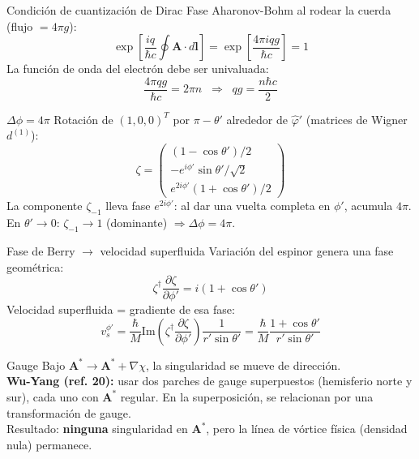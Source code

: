 \documentclass[aspectratio=169]{beamer}
\begin{document}
	\begin{frame}{Condición de cuantización de Dirac}
		Fase Aharonov-Bohm al rodear la cuerda (flujo $= 4\pi g$):
		\[ \exp\!\left[\frac{iq}{\hbar c}\oint\mathbf{A}\cdot d\mathbf{l}\right]
		= \exp\!\left[\frac{4\pi i qg}{\hbar c}\right] = 1 \]
		La función de onda del electrón debe ser univaluada:
		\[ \frac{4\pi qg}{\hbar c} = 2\pi n
		\;\;\Rightarrow\;\; \boxed{qg = \frac{n\hbar c}{2}} \]
	\end{frame}
	
	\begin{frame}{$\Delta\phi = 4\pi$}
		Rotación de $(1,0,0)^T$ por $\pi-\theta'$ alrededor de $\hat{\varphi}'$
		(matrices de Wigner $d^{(1)}$):
		\[ \zeta = \begin{pmatrix}(1-\cos\theta')/2 \\
			-e^{i\phi'}\sin\theta'/\sqrt{2} \\
			e^{2i\phi'}(1+\cos\theta')/2 \end{pmatrix} \]
		La componente $\zeta_{-1}$ lleva fase $e^{2i\phi'}$:
		al dar una vuelta completa en $\phi'$, acumula $4\pi$.\\[6pt]
		En $\theta'\to 0$: $\zeta_{-1}\to 1$ (dominante) $\Rightarrow \Delta\phi = 4\pi$.
	\end{frame}
	
	\begin{frame}{Fase de Berry $\to$ velocidad superfluida}
		Variación del espinor genera una fase geométrica:
		\[ \zeta^\dagger\frac{\partial\zeta}{\partial\phi'}
		= i(1+\cos\theta') \]
		Velocidad superfluida = gradiente de esa fase:
		\[ v_s^{\phi'} = \frac{\hbar}{M}
		\mathrm{Im}\!\left(\zeta^\dagger\frac{\partial\zeta}{\partial\phi'}\right)
		\frac{1}{r'\sin\theta'}
		= \frac{\hbar}{M}\frac{1+\cos\theta'}{r'\sin\theta'} \]
	\end{frame}
	
	\begin{frame}{Gauge}
		Bajo $\mathbf{A}^* \to \mathbf{A}^* + \nabla\chi$, la singularidad
		se mueve de dirección.\\[8pt]
		\textbf{Wu-Yang (ref. 20):} usar dos parches de gauge superpuestos
		(hemisferio norte y sur), cada uno con $\mathbf{A}^*$ regular.
		En la superposición, se relacionan por una transformación de gauge.\\[8pt]
		Resultado: \textbf{ninguna} singularidad en $\mathbf{A}^*$, pero la
		línea de vórtice física (densidad nula) permanece.\\[8pt]
	\end{frame}
\end{document}
